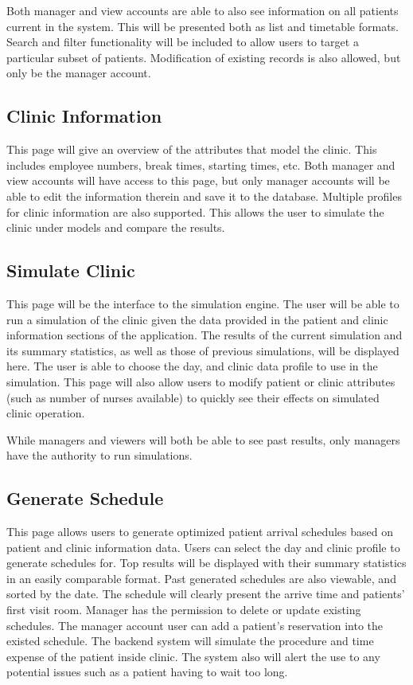 \documentclass[12pt]{article}
\begin{document}
\noindent \newline
Both manager and view accounts are able to also see information on all patients current in the system. This will be presented both as list and timetable formats. Search and filter functionality will be included to allow users to target a particular subset of patients. Modification of existing records is also allowed, but only be the manager account.

\subsection{Clinic Information}
This page will give an overview of the attributes that model the clinic. This includes employee numbers, break times, starting times, etc. Both manager and view accounts will have access to this page, but only manager accounts will be able to edit the information therein and save it to the database. Multiple profiles for clinic information are also supported. This allows the user to simulate the clinic under models and compare the results.

\subsection{Simulate Clinic}
This page will be the interface to the simulation engine. The user will be able to run a simulation of the clinic given the data provided in the patient and clinic information sections of the application. The results of the current simulation and its summary statistics, as well as those of previous simulations, will be displayed here. The user is able to choose the day, and clinic data profile to use in the simulation. This page will also allow users to modify patient or clinic attributes (such as number of nurses available) to quickly see their effects on simulated clinic operation. 

\noindent \newline
While managers and viewers will both be able to see past results, only managers have the authority to run simulations.

\subsection{Generate Schedule}
This page allows users to generate optimized patient arrival schedules based on patient and clinic information data. Users can select the day and clinic profile to generate schedules for. Top results will be displayed with their summary statistics in an easily comparable format. Past generated schedules are also viewable, and sorted by the date. The schedule will clearly present the arrive time and patients’ first visit room.  Manager has the permission to delete or update existing schedules. The manager account user can add a patient’s reservation into the existed schedule. The backend system will simulate the procedure and time expense of the patient inside clinic. The system also will alert the use to any potential issues such as a patient having to wait too long.
\end{document}
